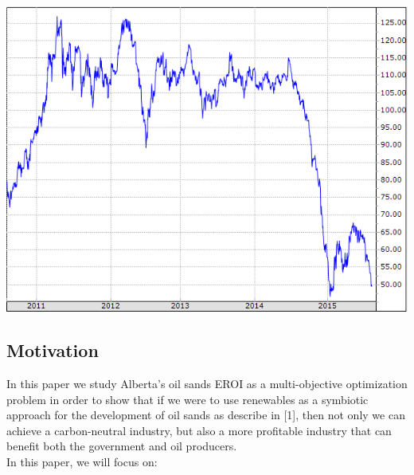 \documentclass[12pt]{article}
\begin{document}
\begin{center}
\includegraphics[scale=0.65]{oilprices.png}
\end{center}

\subsection{Motivation}
In this paper we study Alberta's oil sands EROI as a multi-objective optimization problem in order to show that if we were to use renewables as a symbiotic approach for the development of oil sands as describe in [1], then not only we can achieve a carbon-neutral industry, but also a more profitable industry that can benefit both the government and oil producers. \\

In this paper, we will focus on: 
\end{document}

